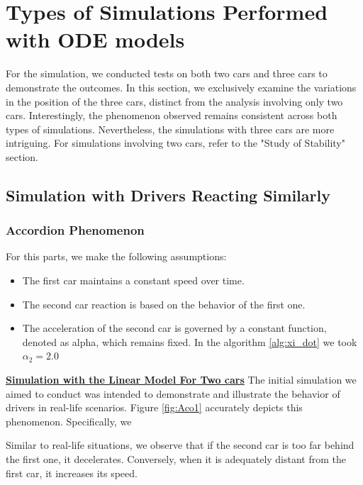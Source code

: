 \documentclass{article}
\begin{document}
		
	
	
	
	
	\section{Types of Simulations Performed with ODE models}
	
	For the simulation, we conducted tests on both two cars and three cars to demonstrate the outcomes. In this section, we exclusively examine the variations in the position of the three cars, distinct from the analysis involving only two cars. Interestingly, the phenomenon observed remains consistent across both types of simulations. Nevertheless, the simulations with three cars are more intriguing. For simulations involving two cars, refer to the "Study of Stability" section.
	
	\subsection{Simulation with Drivers Reacting Similarly}
		\subsubsection{Accordion Phenomenon}
		
		For this parts, we make the following assumptions:
		
		\begin{itemize}
			\item The first car maintains a constant speed over time.
			\item The second car reaction is based on the behavior of the first one.
			\item The acceleration of the second car is governed by a constant function, denoted as alpha, which remains fixed. In the algorithm \ref{alg:xi_dot} we took $\alpha_2=2.0$
		\end{itemize} 
		
		\textbf{\underline{Simulation with the Linear Model For Two cars}} \newline\newline
		The initial simulation we aimed to conduct was intended to demonstrate and illustrate the behavior of drivers in real-life scenarios. Figure \ref{fig:Aco1} accurately depicts this phenomenon. Specifically, we 
		
		Similar to real-life situations, we observe that if the second car is too far behind the first one, it decelerates. Conversely, when it is adequately distant from the first car, it increases its speed.
		
\end{document}
